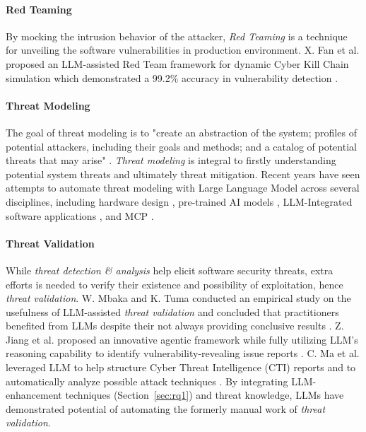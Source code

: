 \paragraph*{Red Teaming} By mocking the intrusion behavior of the attacker,
\textit{Red Teaming} is a technique for unveiling the software vulnerabilities
in production environment. X. Fan et al. proposed an LLM-assisted Red Team
framework for dynamic Cyber Kill Chain simulation which demonstrated
a 99.2\% accuracy in vulnerability detection \citep{10.1145/3803633.3803641}.

\paragraph*{Threat Modeling}
The goal of threat modeling is to "create an abstraction of the system; profiles 
of potential attackers, including their goals and methods; and a catalog of potential
threats that may arise" \citep{threatmodeling}.
\textit{Threat modeling} is integral to firstly understanding potential system
threats and ultimately threat mitigation.
 Recent years have seen attempts
to automate threat modeling with Large Language Model across several
disciplines, including hardware design \citep{11022932}, pre-trained AI models
\citep{10764813}, LLM-Integrated software applications \citep{10.1145/3756681.3757083},
and MCP \citep{11406667}.

\paragraph*{Threat Validation} While \textit{threat detection \& analysis}
help elicit software security threats, extra efforts is needed to verify
their existence and possibility of exploitation, hence \textit{threat validation}.
W. Mbaka and K. Tuma conducted an empirical study on the usefulness
of LLM-assisted \textit{threat validation} and concluded that practitioners
benefited from LLMs despite their not always providing conclusive results
\citep{10.1007/s10664-026-10837-z}. Z. Jiang et al. proposed an innovative
agentic framework while fully utilizing LLM's reasoning capability
to identify vulnerability-revealing issue reports \citep{10.1145/3801149}.
C. Ma et al. leveraged LLM to help structure Cyber Threat Intelligence (CTI)
reports and to automatically analyze possible attack techniques
\citep{MA2025104141}. By integrating LLM-enhancement techniques (Section~\ref{sec:rq1})
and threat knowledge, LLMs have demonstrated potential of automating
the formerly manual work of \textit{threat validation}.

